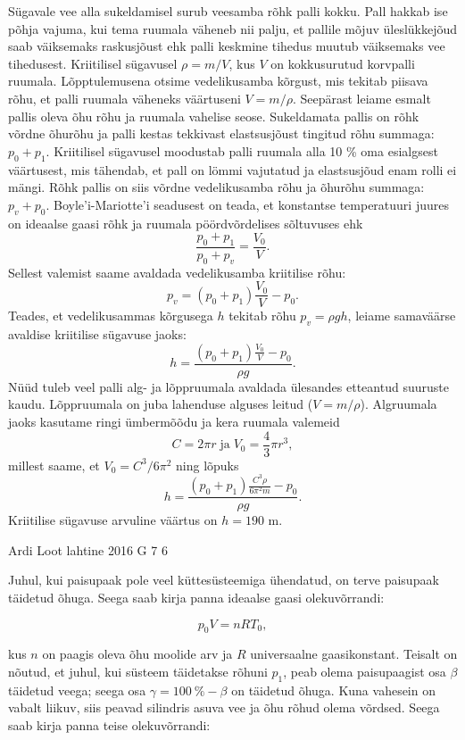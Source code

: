\documentclass[11pt]{article}
\begin{document}
{{\ifSolution
Sügavale vee alla sukeldamisel surub veesamba rõhk palli kokku. Pall hakkab ise põhja vajuma, kui tema ruumala väheneb nii palju, et pallile mõjuv üleslükkejõud saab väiksemaks raskusjõust ehk palli keskmine tihedus muutub väiksemaks vee tihedusest. Kriitilisel sügavusel $\rho=m/V$, kus $V$ on kokkusurutud korvpalli ruumala. Lõpptulemusena otsime vedelikusamba kõrgust, mis tekitab piisava rõhu, et palli ruumala väheneks väärtuseni $V=m/\rho$. Seepärast leiame esmalt pallis oleva õhu rõhu ja ruumala vahelise seose. Sukeldamata pallis on rõhk võrdne õhurõhu ja palli kestas tekkivast elastsusjõust tingitud rõhu summaga: $p_0+p_1$. Kriitilisel sügavusel moodustab palli ruumala alla 10 \% oma esialgsest väärtusest, mis tähendab, et pall on lömmi vajutatud ja elastsusjõud enam rolli ei mängi. Rõhk pallis on siis võrdne vedelikusamba rõhu ja õhurõhu summaga: $p_v+p_0$. Boyle'i-Mariotte'i seadusest on teada, et konstantse temperatuuri juures on ideaalse gaasi rõhk ja ruumala pöördvõrdelises sõltuvuses ehk
\[
\frac{p_0+p_1}{p_0+p_v}=\frac{V_0}{V}.
\]
Sellest valemist saame avaldada vedelikusamba kriitilise rõhu:
\[
p_v = (p_0+p_1) \frac{V_0}{V} - p_0.
\]
Teades, et vedelikusammas kõrgusega $h$ tekitab rõhu $p_v=\rho g h$, leiame samaväärse avaldise kriitilise sügavuse jaoks:
\[
h = \frac{(p_0+p_1) \frac{V_0}{V} - p_0}{\rho g}.
\]
Nüüd tuleb veel palli alg- ja lõppruumala avaldada ülesandes etteantud suuruste kaudu. Lõppruumala on juba lahenduse alguses leitud ($V=m/\rho$). Algruumala jaoks kasutame ringi ümbermõõdu ja kera ruumala valemeid
\[
C = 2\pi r \; \text{ja} \; V_0 = \frac{4}{3}\pi r^3,
\]
millest saame, et $V_0=C^3/6\pi^2$ ning lõpuks
\[
h = \frac{(p_0+p_1) \frac{C^3 \rho}{6\pi^2 m} - p_0}{\rho g}.
\]
Kriitilise sügavuse arvuline väärtus on $h=190$ m.
\fi
}

{Ardi Loot} %
{lahtine} %
{2016} %
{G 7} %
{6} %
{

\ifSolution
Juhul, kui paisupaak pole veel küttesüsteemiga ühendatud, on terve
paisupaak täidetud õhuga. Seega saab kirja panna ideaalse gaasi olekuvõrrandi:

\begin{equation}
p_{0}V=nRT_{0},\label{eq:2016-lahg-07-paisupaak-eq1}
\end{equation}

\noindent kus $n$ on paagis oleva õhu moolide arv ja $R$ universaalne
gaasikonstant. Teisalt on nõutud, et juhul, kui süsteem täidetakse
rõhuni $p_{1}$, peab olema paisupaagist osa $\beta$ täidetud veega;
seega osa $\gamma=\SI{100}{\%}-\beta$ on täidetud õhuga. Kuna vahesein
on vabalt liikuv, siis peavad silindris asuva vee ja õhu rõhud olema
võrdsed. Seega saab kirja panna teise olekuvõrrandi:

}}
\end{document}
